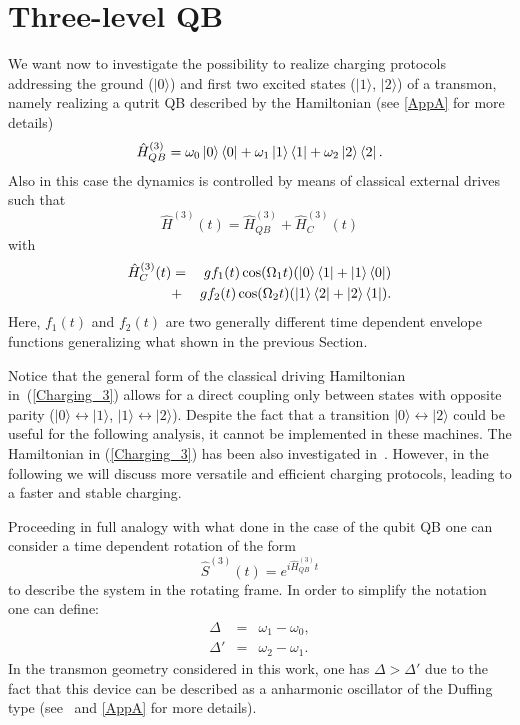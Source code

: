 \documentclass[12pt]{iopart}
\begin{document}
\section{Three-level QB}
\label{sec:qutrit}
We want now to investigate the possibility to realize charging protocols addressing the ground ($|0\rangle$) and first two excited states ($|1\rangle$, $|2\rangle$) of a transmon, namely realizing a qutrit QB described by the Hamiltonian (see \ref{AppA} for more details)
\begin{equation}
\hat{H}_{QB}^{(3)}=\omega_0\ket{0}\bra{0}+\omega_1\ket{1}\bra{1}+\omega_2\ket{2}\bra{2}.
\end{equation}
Also in this case the dynamics is controlled by means of classical external drives such that
\begin{equation}
\hat{H}^{(3)}(t)=\hat{H}_{QB}^{(3)}+\hat{H}_C^{(3)}(t)
\end{equation}
with
\begin{eqnarray}
\hat{H}_C^{(3)}(t)&=&gf_1(t)\cos(\Omega_1 t)(\ket{0}\bra{1}+\ket{1}\bra{0})\nonumber\\
&+&gf_2(t)\cos(\Omega_2 t)(\ket{1}\bra{2}+\ket{2}\bra{1}). 
\label{Charging_3}
\end{eqnarray}
Here, $f_{1}(t)$ and $f_{2}(t)$ are two generally different time dependent envelope functions generalizing what shown in the previous Section.

Notice that the general form of the classical driving Hamiltonian in~(\ref{Charging_3}) allows for a direct coupling only between states with opposite parity ($|0\rangle \leftrightarrow |1\rangle$, $|1\rangle \leftrightarrow |2\rangle$). Despite the fact that a transition $|0\rangle \leftrightarrow |2\rangle$ could be useful for the following analysis, it cannot be implemented in these machines. The Hamiltonian in (\ref{Charging_3}) has been also investigated in~\cite{Hu22}. However, in the following we will discuss more versatile and efficient charging protocols, leading to a faster and stable charging. 

Proceeding in full analogy with what done in the case of the qubit QB one can consider a time dependent rotation of the form
\begin{equation}
\hat{S}^{(3)}(t)=e^{i\hat{H}_{QB}^{(3)}t}
\end{equation}
to describe the system in the rotating frame. 
In order to simplify the notation one can define:
\begin{eqnarray}
    \Delta&=&\omega_1-\omega_0, \\ \Delta'&=&\omega_2-\omega_1.
\end{eqnarray}
In the transmon geometry considered in this work, one has $\Delta>\Delta'$ due to the fact that this device can be described as a anharmonic oscillator of the Duffing type (see~\cite{Koch07, Krantz19} and \ref{AppA} for more details). 
\end{document}
